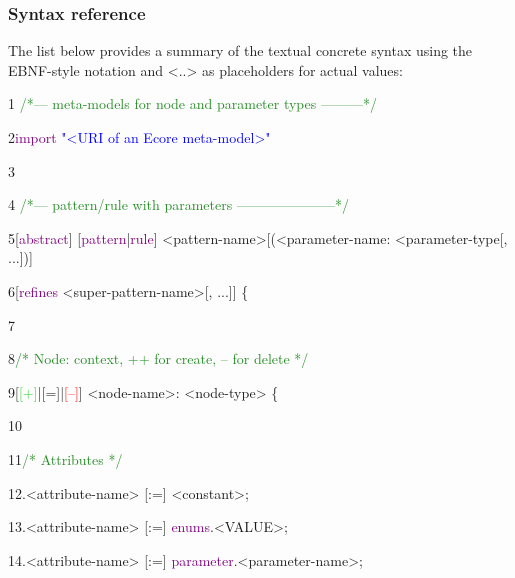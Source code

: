 \clearpage

\subsubsection{Syntax reference}

The list below provides a summary of the textual concrete syntax using the EBNF-style notation and \textsf{<..>} as placeholders for actual values:\newline\newline

{

1\hspace{0.5cm} \textcolor{ForestGreen}{/*--- meta-models for node and parameter types ---------*/}

2\hspace{0.5cm}\textcolor{Purple}{import}\textcolor{blue}{ "<URI of an Ecore meta-model>"}

3

4 \hspace{0.5cm}\textcolor{ForestGreen}{/*--- pattern/rule with parameters ---------------------*/}

5\hspace{0.5cm}[\textcolor{Purple}{abstract}] [\textcolor{Purple}{pattern}|\textcolor{Purple}{rule}] <pattern-name>[(<parameter-name: <parameter-type[, ...])]

6\hspace{0.5cm}[\textcolor{Purple}{refines} <super-pattern-name>[, ...]] \{

7

8\hspace{1cm}\textcolor{ForestGreen}{/* Node: context, ++ for create, -- for delete */}

9\hspace{1cm}[\textcolor{LimeGreen}{[+]}|[=]|\textcolor{Red}{[--]}] <node-name>: <node-type> \{

10

11\hspace{1.5cm}\textcolor{ForestGreen}{/* Attributes */}

12\hspace{1.5cm}.<attribute-name> [:=] <constant>;

13\hspace{1.5cm}.<attribute-name> [:=] \textcolor{Purple}{enums}.<VALUE>;

14\hspace{1.5cm}.<attribute-name> [:=] \textcolor{Purple}{parameter}.<parameter-name>;

}
